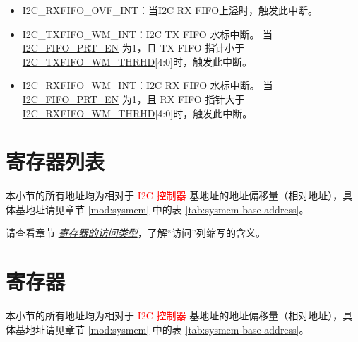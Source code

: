 \documentclass[main\_\_CN.tex]{subfiles}
\begin{document}
\begin{itemize}
\item \label{int:i2c-rxfifo-ovf}I2C\_RXFIFO\_OVF\_INT：当I2C RX FIFO上溢时，触发此中断。
\item \label{int:i2c-txfifo-wm}I2C\_TXFIFO\_WM\_INT：I2C TX FIFO 水标中断。 当\hyperref[fielddesc:I2CFIFOPRTEN]{I2C\_FIFO\_PRT\_EN} 为1，且 TX FIFO 指针小于 \\\hyperref[fielddesc:I2CTXFIFOWMTHRHD]{I2C\_TXFIFO\_WM\_THRHD}[4:0]时，触发此中断。
\item \label{int:i2c-rxfifo-wm}I2C\_RXFIFO\_WM\_INT：I2C RX FIFO 水标中断。 当\hyperref[fielddesc:I2CFIFOPRTEN]{I2C\_FIFO\_PRT\_EN} 为1，且 RX FIFO 指针大于 \\\hyperref[fielddesc:I2CRXFIFOWMTHRHD]{I2C\_RXFIFO\_WM\_THRHD}[4:0]时，触发此中断。
\end{itemize}



\clearpage
\section{寄存器列表}
\label{sec:i2c-reg-summ}
\hypertarget{i2c-reg-summ}{}

本小节的所有地址均为相对于 \textcolor{red}{I2C 控制器} 基地址的地址偏移量（相对地址），具体基地址请见章节 \ref{mod:sysmem} \textit{} 中的表 \ref{tab:sysmem-base-address}。

请查看章节 \hyperref[glossary-access-types]{\textit{寄存器的访问类型}}，了解“访问”列缩写的含义。





\clearpage
\section{寄存器}

本小节的所有地址均为相对于 \textcolor{red}{I2C 控制器} 基地址的地址偏移量（相对地址），具体基地址请见章节 \ref{mod:sysmem} \textit{} 中的表 \ref{tab:sysmem-base-address}。


\end{document}
